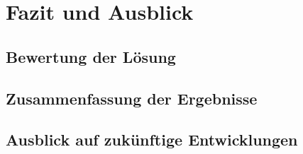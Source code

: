 \chapter{Fazit und Ausblick}\label{ch:summary}

\section{Bewertung der Lösung}\label{sec:summary_evaluation}

\section{Zusammenfassung der Ergebnisse}\label{sec:summary_summary}

\section{Ausblick auf zukünftige Entwicklungen}\label{sec:summary_outlook}